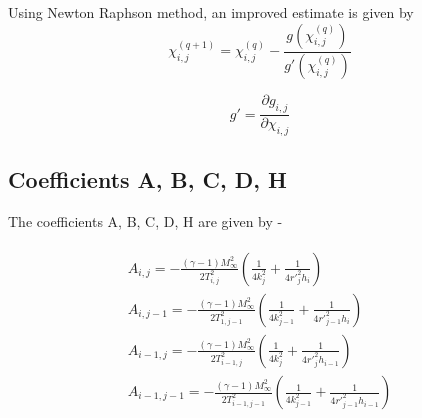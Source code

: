 \documentclass[a4paper]{article}
\begin{document}
	Using Newton Raphson method, an improved estimate is given by
	\begin{equation}
	\chi^{(q+1)}_{i,j} = \chi^{(q)}_{i,j}
	- \frac{g(\chi^{(q)}_{i,j})}{g'(\chi^{(q)}_{i,j})}
	\end{equation}
	
	\begin{equation}
	g' = \frac{\partial g_{i,j}}{\partial \chi_{i,j}}
	\end{equation}
	
	
	\subsection{Coefficients A, B, C, D, H}
	The coefficients A, B, C, D, H are given by - 
	
	\begin{align}
		\begin{split}		
		A_{i,j} = -\frac{(\gamma-1)M_\infty^2}{2T_{i,j}^2}
		\left(
			\frac{1}{4k_j^2} + \frac{1}{4{r'}_j^2 h_i}
		\right) \\
		A_{i,j-1} = -\frac{(\gamma-1)M_\infty^2}{2T_{1,j-1}^2}
		\left(
			\frac{1}{4k_{j-1}^2} + \frac{1}{4{r'}_{j-1}^2 h_i}
		\right) \\
		A_{i-1,j} = -\frac{(\gamma-1)M_\infty^2}{2T_{i-1,j}^2}
		\left(
			\frac{1}{4k_j^2} + \frac{1}{4{r'}_j^2 h_{i-1}}
		\right) \\
		A_{i-1,j-1} = -\frac{(\gamma-1)M_\infty^2}{2T_{i-1,j-1}^2}
		\left(
			\frac{1}{4k_{j-1}^2} + \frac{1}{4{r'}_{j-1}^2 h_{i-1}}
		\right)
		\end{split}
	\end{align}
	
\end{document}
